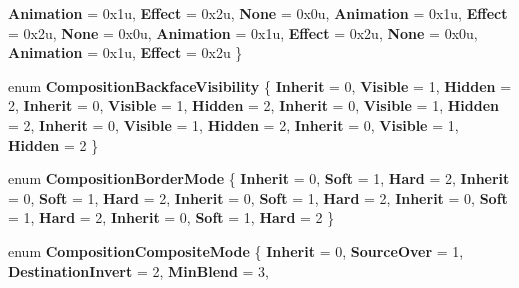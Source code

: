 \begin{DoxyCompactItemize}
\newline
{\bfseries Animation} = 0x1u, 
{\bfseries Effect} = 0x2u, 
{\bfseries None} = 0x0u, 
{\bfseries Animation} = 0x1u, 
\newline
{\bfseries Effect} = 0x2u, 
{\bfseries None} = 0x0u, 
{\bfseries Animation} = 0x1u, 
{\bfseries Effect} = 0x2u, 
\newline
{\bfseries None} = 0x0u, 
{\bfseries Animation} = 0x1u, 
{\bfseries Effect} = 0x2u
 \}
\item 
\mbox{\label{namespace_windows_1_1_u_i_1_1_composition_a2208fe30c093609e4c2f6f06851913d2}} 
enum {\bfseries Composition\+Backface\+Visibility} \{ \newline
{\bfseries Inherit} = 0, 
{\bfseries Visible} = 1, 
{\bfseries Hidden} = 2, 
{\bfseries Inherit} = 0, 
\newline
{\bfseries Visible} = 1, 
{\bfseries Hidden} = 2, 
{\bfseries Inherit} = 0, 
{\bfseries Visible} = 1, 
\newline
{\bfseries Hidden} = 2, 
{\bfseries Inherit} = 0, 
{\bfseries Visible} = 1, 
{\bfseries Hidden} = 2, 
\newline
{\bfseries Inherit} = 0, 
{\bfseries Visible} = 1, 
{\bfseries Hidden} = 2
 \}
\item 
\mbox{\label{namespace_windows_1_1_u_i_1_1_composition_ad094aac2d72715708083e1a34f7835f0}} 
enum {\bfseries Composition\+Border\+Mode} \{ \newline
{\bfseries Inherit} = 0, 
{\bfseries Soft} = 1, 
{\bfseries Hard} = 2, 
{\bfseries Inherit} = 0, 
\newline
{\bfseries Soft} = 1, 
{\bfseries Hard} = 2, 
{\bfseries Inherit} = 0, 
{\bfseries Soft} = 1, 
\newline
{\bfseries Hard} = 2, 
{\bfseries Inherit} = 0, 
{\bfseries Soft} = 1, 
{\bfseries Hard} = 2, 
\newline
{\bfseries Inherit} = 0, 
{\bfseries Soft} = 1, 
{\bfseries Hard} = 2
 \}
\item 
\mbox{\label{namespace_windows_1_1_u_i_1_1_composition_a70df9b7791d5834e00518dd51febcf2e}} 
enum {\bfseries Composition\+Composite\+Mode} \{ \newline
{\bfseries Inherit} = 0, 
{\bfseries Source\+Over} = 1, 
{\bfseries Destination\+Invert} = 2, 
{\bfseries Min\+Blend} = 3, 

\end{DoxyCompactItemize}
